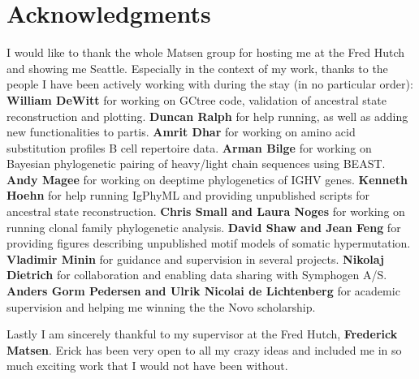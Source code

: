 % 

\cleardoublepage

\section*{Acknowledgments}
I would like to thank the whole Matsen group for hosting me at the Fred Hutch and showing me Seattle.
Especially in the context of my work, thanks to the people I have been actively working with during the stay (in no particular order):
\textbf{William DeWitt} for working on GCtree code, validation of ancestral state reconstruction and plotting.
\textbf{Duncan Ralph} for help running, as well as adding new functionalities to partis.
\textbf{Amrit Dhar} for working on amino acid substitution profiles B cell repertoire data.
\textbf{Arman Bilge} for working on Bayesian phylogenetic pairing of heavy/light chain sequences using BEAST.
\textbf{Andy Magee} for working on deeptime phylogenetics of IGHV genes.
\textbf{Kenneth Hoehn} for help running IgPhyML and providing unpublished scripts for ancestral state reconstruction.
\textbf{Chris Small and Laura Noges} for working on running clonal family phylogenetic analysis.
\textbf{David Shaw and Jean Feng} for providing figures describing unpublished motif models of somatic hypermutation.
\textbf{Vladimir Minin} for guidance and supervision in several projects.
\textbf{Nikolaj Dietrich} for collaboration and enabling data sharing with Symphogen A/S.
\textbf{Anders Gorm Pedersen and Ulrik Nicolai de Lichtenberg} for academic supervision and helping me winning the the Novo scholarship.

Lastly I am sincerely thankful to my supervisor at the Fred Hutch, \textbf{Frederick Matsen}.
Erick has been very open to all my crazy ideas and included me in so much exciting work that I would not have been without.



